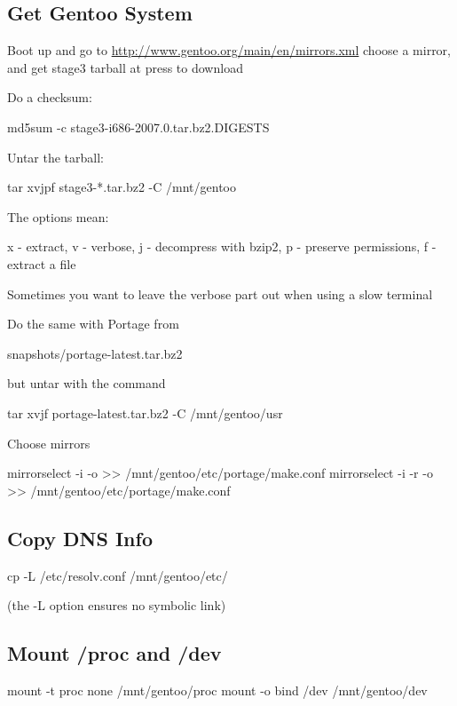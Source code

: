 \subsection{Get Gentoo System}
Boot up  and go to \url{http://www.gentoo.org/main/en/mirrors.xml}
choose a mirror, and get stage3 tarball at  press  to download

Do a checksum:
\begin{code}
md5sum -c stage3-i686-2007.0.tar.bz2.DIGESTS
\end{code}

Untar the tarball:
\begin{code}
tar xvjpf stage3-*.tar.bz2 -C /mnt/gentoo
\end{code}
The options mean:
\begin{code}
x - extract, v - verbose, 
j - decompress with bzip2, p - preserve permissions,
f - extract a file
\end{code}
Sometimes you want to leave the verbose part out when using a slow terminal

Do the same with Portage from
\begin{code}
snapshots/portage-latest.tar.bz2
\end{code}
but untar with the command
\begin{code}
tar xvjf portage-latest.tar.bz2 -C /mnt/gentoo/usr
\end{code}

Choose mirrors
\begin{code}
mirrorselect -i -o >> /mnt/gentoo/etc/portage/make.conf
mirrorselect -i -r -o >> /mnt/gentoo/etc/portage/make.conf
\end{code}

\subsection{Copy DNS Info}
\begin{code}
cp -L /etc/resolv.conf /mnt/gentoo/etc/
\end{code}
(the -L option ensures no symbolic link)

\subsection{Mount /proc and /dev}
\begin{code}
mount -t proc none /mnt/gentoo/proc
mount -o bind /dev /mnt/gentoo/dev
\end{code}

